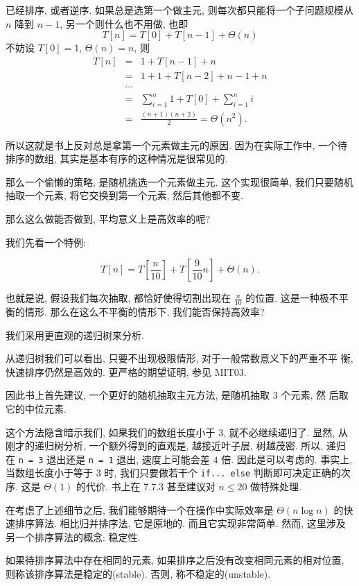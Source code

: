 \documentclass[a4paper]{ctexart}
\theoremstyle{definition}
\theoremstyle{definition}
\begin{document}
 已经排序, 或者逆序. 如果总是选第一个做主元,
则每次都只能将一个子问题规模从 $n$ 降到 $n - 1$, 另一个则什么也不用做,
也即
$$
T[n] = T[0] + T[n - 1] + \Theta(n)
$$
不妨设 $T[0] = 1$, $\Theta(n) = n$, 则
$$
\begin{array}{rcl}
T[n] &=& 1 + T[n - 1] + n \\
&=& 1 + 1 + T[n - 2] + n - 1 + n \\
&\cdots&\\
&=& \sum_{i = 1}^{n} 1 + T[0] + \sum_{i = 1}^n i \\
&=& \frac{(n + 1)(n + 2)}{2} = \Theta(n^2).
\end{array}
$$

所以这就是书上反对总是拿第一个元素做主元的原因. 因为在实际工作中,
一个待排序的数组, 其实是基本有序的这种情况是很常见的.

那么一个偷懒的策略, 是随机挑选一个元素做主元. 这个实现很简单,
我们只要随机抽取一个元素, 将它交换到第一个元素, 然后其他都不变.

那么这么做能否做到, 平均意义上是高效率的呢?

我们先看一个特例:

$$
T[n] = T[\frac{n}{10}] + T[\frac{9}{10}n] + \Theta(n).
$$

也就是说, 假设我们每次抽取, 都恰好使得切割出现在 $\frac{n}{10}$ 的位置.
这是一种极不平衡的情形. 那么在这么不平衡的情形下, 我们能否保持高效率? 

我们采用更直观的递归树来分析.

从递归树我们可以看出, 只要不出现极限情形, 对于一般常数意义下的严重不平
衡, 快速排序仍然是高效的. 更严格的期望证明, 参见 MIT03.

因此书上首先建议, 一个更好的随机抽取主元方法, 是随机抽取 3 个元素, 然
后取它的中位元素. 

这个方法隐含暗示我们, 如果我们的数组长度小于 3, 就不必继续递归了. 显然,
从刚才的递归树分析, 一个额外得到的直观是, 越接近叶子层, 树越茂密. 所以,
递归在 \verb|n = 3| 退出还是 \verb|n = 1| 退出, 速度上可能会差 $4$ 倍.
因此是可以考虑的. 事实上, 当数组长度小于等于 $3$ 时, 我们只要做若干个\newline
\verb|if... else| 判断即可决定正确的次序. 这是 $\Theta(1)$ 的代价.
书上在 7.7.3 甚至建议对 $n \leq 20$ 做特殊处理.

在考虑了上述细节之后, 我们能够期待一个在操作中实际效率是
$\Theta(n\log n)$ 的快速排序算法. 相比归并排序法, 它是原地的.
而且它实现非常简单. 然而, 这里涉及另一个排序算法的概念: 稳定性. 

 如果待排序算法中存在相同的元素,
如果排序之后没有改变相同元素的相对位置, 则称该排序算法是稳定的(stable).
否则, 称不稳定的(unstable).
\end{document}
